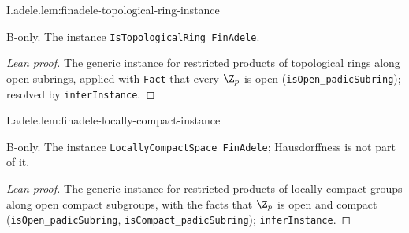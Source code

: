 \begin{lemma}
\bonly
{}
\end{lemma}
\begin{tfformal}{I.adele.lem:finadele-topological-ring-instance}
\begin{tffidelity}
B-only. The instance \texttt{IsTopologicalRing FinAdele}.
\end{tffidelity}
\end{tfformal}
\begin{proof}[Lean proof]
The generic instance for restricted products of topological rings along open subrings, applied with \texttt{Fact} that every $\Z_p$ is open (\texttt{isOpen\_padicSubring}); resolved by \texttt{inferInstance}.
\end{proof}

\begin{lemma}
\bonly
{}
\end{lemma}
\begin{tfformal}{I.adele.lem:finadele-locally-compact-instance}
\begin{tffidelity}
B-only. The instance \texttt{LocallyCompactSpace FinAdele}; Hausdorffness is not part of it.
\end{tffidelity}
\end{tfformal}
\begin{proof}[Lean proof]
The generic instance for restricted products of locally compact groups along open compact subgroups, with the facts that $\Z_p$ is open and compact (\texttt{isOpen\_padicSubring}, \texttt{isCompact\_padicSubring}); \texttt{inferInstance}.
\end{proof}

